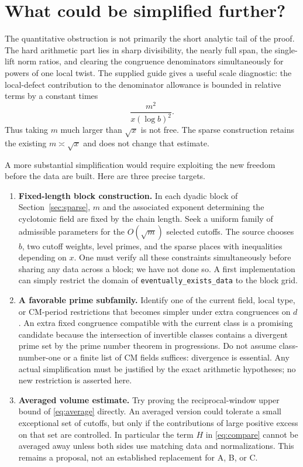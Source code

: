 \documentclass[11pt,a4paper]{article}
\theoremstyle{remark}\newtheorem{remark}[theorem]{Remark}
\begin{document}
\section{What could be simplified further?}\label{sec:future}
The quantitative obstruction is not primarily the short analytic tail of the proof. The hard arithmetic part lies in sharp divisibility, the nearly full span, the single-lift norm ratios, and clearing the congruence denominators simultaneously for powers of one local twist. The supplied guide gives a useful scale diagnostic: the local-defect contribution to the denominator allowance is bounded in relative terms by a constant times
\[\frac{m^2}{x(\log b)^2}.\]
Thus taking $m$ much larger than $\sqrt x$ is not free. The sparse construction retains the existing $m\asymp\sqrt x$ and does not change that estimate.

A more substantial simplification would require exploiting the new freedom before the data are built. Here are three precise targets.
\begin{enumerate}
\item \textbf{Fixed-length block construction.} In each dyadic block of Section~\ref{sec:sparse}, $m$ and the associated exponent determining the cyclotomic field are fixed by the chain length. Seek a uniform family of admissible parameters for the $O(\sqrt m)$ selected cutoffs. The source chooses $b$, two cutoff weights, level primes, and the sparse places with inequalities depending on $x$. One must verify all these constraints simultaneously before sharing any data across a block; we have not done so. A first implementation can simply restrict the domain of \texttt{eventually\_exists\_data} to the block grid.
\item \textbf{A favorable prime subfamily.} Identify one of the current field, local type, or CM-period restrictions that becomes simpler under extra congruences on $d$. An extra fixed congruence compatible with the current class is a promising candidate because the intersection of invertible classes contains a divergent prime set by the prime number theorem in progressions. Do not assume class-number-one or a finite list of CM fields suffices: divergence is essential. Any actual simplification must be justified by the exact arithmetic hypotheses; no new restriction is asserted here.
\item \textbf{Averaged volume estimate.} Try proving the reciprocal-window upper bound of \eqref{eq:average} directly. An averaged version could tolerate a small exceptional set of cutoffs, but only if the contributions of large positive excess on that set are controlled. In particular the term $H$ in \eqref{eq:compare} cannot be averaged away unless both sides use matching data and normalizations. This remains a proposal, not an established replacement for A, B, or C.
\end{enumerate}
\end{document}
